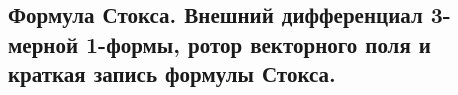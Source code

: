 \subsection{Формула Стокса. Внешний дифференциал 3-мерной 1-формы, ротор векторного поля и краткая запись формулы Стокса.}